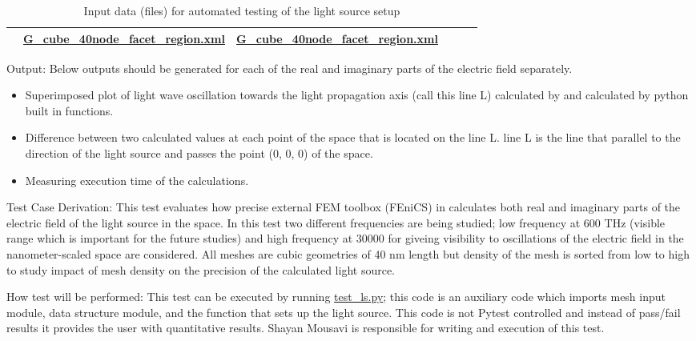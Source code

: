 \documentclass[12pt, titlepage]{article}
\begin{document}
\begin{enumerate}
\begin{table}[h!]
\begin{tabular}{|c|c|c|c|c|c|}
		& \href{https://github.com/shmouses/SPDFM/tree/master/src/Mesh/G_cube_40node_facet_region.xml}{G\_cube\_40node\_facet\_region.xml} &
		\href{https://github.com/shmouses/SPDFM/tree/master/src/Mesh/G_cube_40node_facet_region.xml}{G\_cube\_40node\_facet\_region.xml} \\
		\hline
	\end{tabular}
	\caption{Input data (files) for automated testing of the light source setup}
	\label{LS_t}
\end{table}

Output: Below outputs should be generated for each of the real and imaginary parts of the electric field separately.

\begin{itemize}
	\item Superimposed plot of light wave oscillation towards the light propagation axis (call this line L) calculated by \progname{} and calculated by python built in functions.  
	\item  Difference between two calculated values at each point of the space that is located on the line L. line L is the line that parallel to the direction of the light source and passes the point (0, 0, 0) of the space. 
	\item Measuring execution time of the calculations.
	
\end{itemize}	

Test Case Derivation: This test evaluates how precise external FEM toolbox (FEniCS) in \progname{} calculates both real and imaginary parts of the electric field of the light source in the space. In this test two different frequencies are being studied; low frequency at 600 THz (visible range which is important for the future studies) and high frequency at 30000 for giveing visibility to oscillations of the electric field in the nanometer-scaled space are considered. All meshes are cubic geometries of 40 nm length but density of the mesh is sorted from low to high to study impact of mesh density on the precision of the calculated light source. 

How test will be performed: This test can be executed by running \href{https://github.com/shmouses/SPDFM/tree/master/src/test_ls.py}{test\_ls.py}; this code is an auxiliary code which imports \progname{} mesh input module, data structure module, and the function that sets up the light source. This code is not Pytest controlled and instead of pass/fail results it provides the user with quantitative results. Shayan Mousavi is responsible for writing and execution of this test.   



\end{enumerate}
\end{document}
